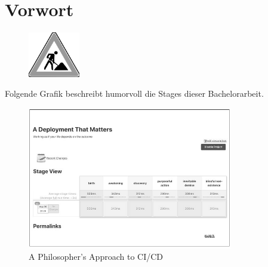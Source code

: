 

\bigskip

\begingroup
\let\clearpage\relax
\let\cleardoublepage\relax
\let\cleardoublepage\relax
\chapter*{Vorwort}



\bigskip

\begin{figure}[htbp]
 \centering
 \includegraphics[width=0.2\textwidth]{gfx/baustelle.pdf}
\end{figure}

Folgende Grafik beschreibt humorvoll die Stages dieser Bachelorarbeit.

\begin{figure}[htbp]
 \centering
 \includegraphics[width=0.8\textwidth]{gfx/philosophers-approach-b-1.jpg}
 \caption{A Philosopher’s Approach to CI/CD \cite{ROELBOB:2020}}
\end{figure}



\endgroup



